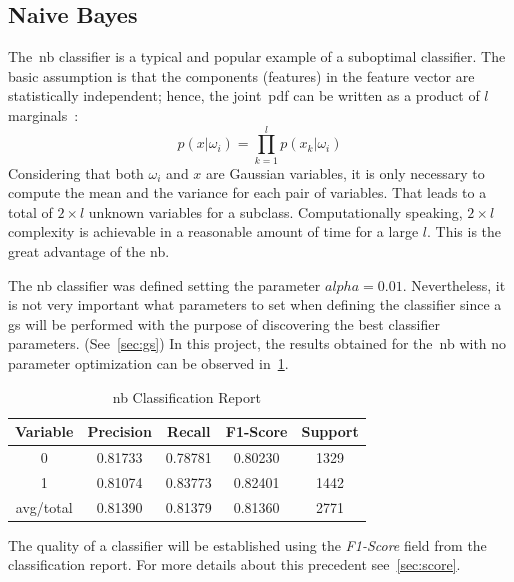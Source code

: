 \subsection{Naive Bayes}
The~\ac{nb} classifier is a typical and popular example of a suboptimal classifier. The basic assumption is that the components (features) in the feature vector are statistically independent; hence, the joint~\ac{pdf} can be written as a product of $l$ marginals~\cite{classif}:
\begin{equation}
p(x|\omega_i)=\prod_{k=1}^{l}p(x_k|\omega_i)
\label{ec:nb}
\end{equation}
Considering that both $\omega_i$ and $x$ are Gaussian variables, it is only necessary to compute the mean and the variance for each pair of variables. That leads to a total of $2\times l$ unknown variables for a subclass. Computationally speaking, $2\times l$ complexity is achievable in a reasonable amount of time for a large $l$. This is the great advantage of the \ac{nb}.\par
The \ac{nb} classifier was defined setting the parameter $alpha = 0.01$. Nevertheless, it is not very important what parameters to set when defining the classifier since a \ac{gs} will be performed with the purpose of discovering the best classifier parameters. (See~\cref{sec:gs})
In this project, the results obtained for the~\ac{nb} with no parameter optimization can be observed in~\cref{tab:nb1}.
\begin{table}[h!]
	\centering
	\begin{tabular}{||c c c c c||} 
		\hline
		Variable & Precision & Recall & F1-Score & Support \\ [0.5ex] 
		\hline\hline
		0 & 0.81733 & 0.78781 & 0.80230 & 1329 \\ 
		1 & 0.81074 & 0.83773 & 0.82401 & 1442 \\
		avg/total & 0.81390 & 0.81379 & 0.81360 & 2771 \\
		[1ex] 
		\hline
	\end{tabular}
	\caption{\acl{nb} Classification Report}
	\label{tab:nb1}
\end{table}
The quality of a classifier will be established using the \textit{F1-Score} field from the classification report. For more details about this precedent see~\cref{sec:score}.
